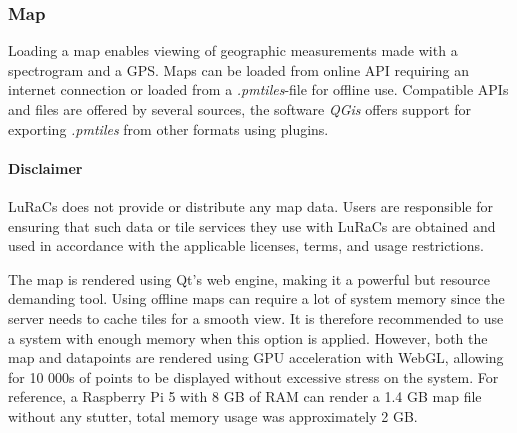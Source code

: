 \subsubsection{Map}
Loading a map enables viewing of geographic measurements made with a spectrogram and a GPS. Maps can be loaded from online API requiring an internet connection or loaded from a \textit{.pmtiles}-file for offline use. Compatible APIs and files are offered by several sources, the software \textit{QGis} offers support for exporting \textit{.pmtiles} from other formats using plugins.

\paragraph{Disclaimer} LuRaCs does not provide or distribute any map data. Users are responsible for ensuring that such data or tile services they use with LuRaCs are obtained and used in accordance with the applicable licenses, terms, and usage restrictions.

The map is rendered using Qt's web engine, making it a powerful but resource demanding tool. Using offline maps can require a lot of system memory since the server needs to cache tiles for a smooth view. It is therefore recommended to use a system with enough memory when this option is applied. However, both the map and datapoints are rendered using GPU acceleration with WebGL, allowing for 10 000s of points to be displayed without excessive stress on the system. For reference, a Raspberry Pi 5 with 8 GB of RAM can render a 1.4 GB map file without any stutter, total memory usage was approximately 2 GB.

